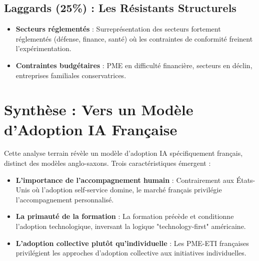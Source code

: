 \subsection{Laggards (25\%) : Les Résistants Structurels}

\begin{itemize}
    \item \textbf{Secteurs réglementés} : Surreprésentation des secteurs fortement réglementés (défense, finance, santé) où les contraintes de conformité freinent l'expérimentation.
    \item \textbf{Contraintes budgétaires} : PME en difficulté financière, secteurs en déclin, entreprises familiales conservatrices.
\end{itemize}

\section{Synthèse : Vers un Modèle d'Adoption IA Française}

Cette analyse terrain révèle un modèle d'adoption IA spécifiquement français, distinct des modèles anglo-saxons. Trois caractéristiques émergent :

\begin{itemize}
    \item \textbf{L'importance de l'accompagnement humain} : Contrairement aux États-Unis où l'adoption self-service domine, le marché français privilégie l'accompagnement personnalisé.
    \item \textbf{La primauté de la formation} : La formation précède et conditionne l'adoption technologique, inversant la logique "technology-first" américaine.
    \item \textbf{L'adoption collective plutôt qu'individuelle} : Les PME-ETI françaises privilégient les approches d'adoption collective aux initiatives individuelles.
\end{itemize}
